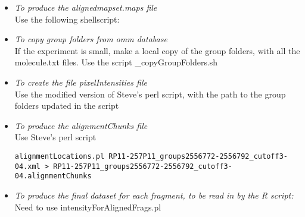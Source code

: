 \documentclass[11pt]{article}
\begin{document}
\begin{itemize}
\item \emph{To produce the alignedmapset.maps file}\\
Use the following shellscript:

\item \emph{To copy group folders from omm database}\\
If the experiment is small, make a local copy of the group folders, with all the molecule.txt files. Use the script \_copyGroupFolders.sh

\item \emph{To create the file pixelIntensities file} \\
Use the modified version of Steve’s perl script, with the path to the group folders updated in the script

\item \emph{To produce the alignmentChunks file} \\
Use Steve's perl script
\vspace{-0.25cm} {\scriptsize{\begin{verbatim}
alignmentLocations.pl RP11-257P11_groups2556772-2556792_cutoff3-04.xml > RP11-257P11_groups2556772-2556792_cutoff3-04.alignmentChunks
\end{verbatim} 
}}

\item \emph{To produce the final dataset for each fragment, to be read in by the R script:} \\
Need to use intensityForAlignedFrags.pl

\end{itemize}

\end{document}
